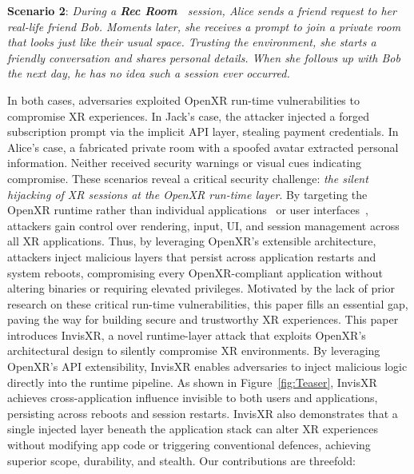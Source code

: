 \documentclass[letterpaper,twocolumn,10pt]{article}
\begin{document}
\hypertarget{scenario2}{\textbf{Scenario 2}: \textit{During a \textbf{Rec Room~\cite{recroom_steam}} session, Alice sends a friend request to her real-life friend Bob. Moments later, she receives a prompt to join a private room that looks just like their usual space. Trusting the environment, she starts a friendly conversation and shares personal details. When she follows up with Bob the next day, he has no idea such a session ever occurred.}} 

In both cases, adversaries exploited OpenXR run-time vulnerabilities to compromise XR experiences. In Jack's case, the attacker injected a forged subscription prompt via the implicit API layer, stealing payment credentials. In Alice's case, a fabricated private room with a spoofed avatar extracted personal information. Neither received security warnings or visual cues indicating compromise. These scenarios reveal a critical security challenge: \textit{the silent hijacking of XR sessions at the OpenXR run-time layer}. By targeting the OpenXR runtime rather than individual applications~\cite{yang2024inception} or user interfaces~\cite{zhang2023s}, attackers gain control over rendering, input, UI, and session management across all XR applications. Thus, by leveraging OpenXR's extensible architecture, attackers inject malicious layers that persist across application restarts and system reboots, compromising every OpenXR-compliant application without altering binaries or requiring elevated privileges. Motivated by the lack of prior research on these critical run-time vulnerabilities, this paper fills an essential gap, paving the way for building secure and trustworthy XR experiences. This paper introduces InvisXR, a novel runtime-layer attack that exploits OpenXR's architectural design to silently compromise XR environments. By leveraging OpenXR's API extensibility, InvisXR enables adversaries to inject malicious logic directly into the runtime pipeline. As shown in Figure~\ref{fig:Teaser}, InvisXR achieves cross-application influence invisible to both users and applications, persisting across reboots and session restarts. InvisXR also demonstrates that a single injected layer beneath the application stack can alter XR experiences without modifying app code or triggering conventional defences, achieving superior scope, durability, and stealth. Our contributions are threefold:
\end{document}
